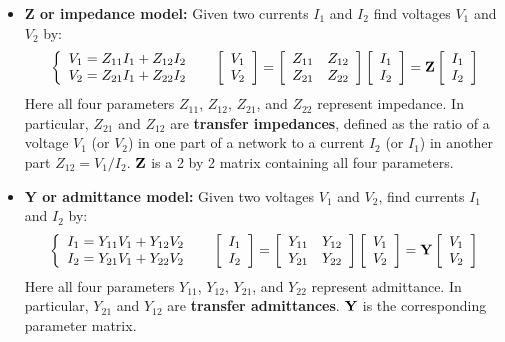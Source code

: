 \begin{itemize}
\item {\bf Z or impedance model:} Given two currents $I_1$ and $I_2$ 
  find voltages $V_1$ and $V_2$ by:
  \[ \left\{ \begin{array}{l} V_1=Z_{11}I_1+Z_{12}I_2 \\
    V_2=Z_{21}I_1+Z_{22}I_2 \end{array} \right.\;\;\;\;\;
  \left[ \begin{array}{l} V_1 \\ V_2\end{array} \right]=
  \left[ \begin{array}{ll} Z_{11} & Z_{12}\\Z_{21} & Z_{22}\end{array}\right]
  \left[ \begin{array}{l} I_1 \\ I_2\end{array} \right]
  ={\bf Z}\left[ \begin{array}{l} I_1 \\ I_2\end{array} \right] \]
  Here all four parameters $Z_{11}$, $Z_{12}$, $Z_{21}$, and $Z_{22}$ represent
  impedance. In particular, $Z_{21}$ and $Z_{12}$ are {\bf transfer impedances}, 
  defined as the ratio of a voltage $V_1$ (or $V_2$) in one part of a network to 
  a current $I_2$ (or $I_1$) in another part $Z_{12}=V_1/I_2$. ${\bf Z}$ is a 2 
  by 2 matrix containing all four parameters.

\item {\bf Y or admittance model:} Given two voltages $V_1$ and $V_2$,
  find currents $I_1$ and $I_2$ by:
  \[ \left\{ \begin{array}{l} I_1=Y_{11}V_1+Y_{12}V_2 \\
    I_2=Y_{21}V_1+Y_{22}V_2 \end{array} \right.\;\;\;\;\;
  \left[ \begin{array}{l} I_1 \\ I_2\end{array} \right]=
  \left[ \begin{array}{ll} Y_{11} & Y_{12}\\Y_{21} & Y_{22}\end{array}\right]
  \left[ \begin{array}{l} V_1 \\ V_2\end{array} \right]
  ={\bf Y}\left[ \begin{array}{l} V_1 \\ V_2\end{array} \right]  \]
  Here all four parameters $Y_{11}$, $Y_{12}$, $Y_{21}$, and $Y_{22}$ represent
  admittance. In particular, $Y_{21}$ and $Y_{12}$ are {\bf transfer admittances}. 
  ${\bf Y}$ is the corresponding parameter matrix.


\end{itemize}
